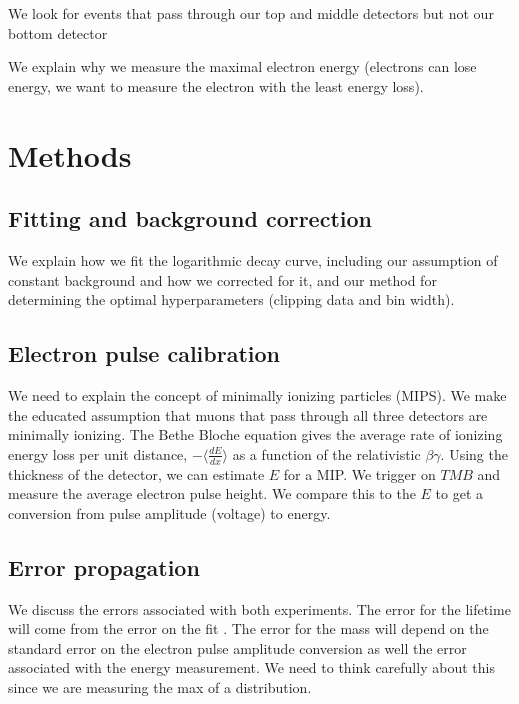 \documentclass[aps,prb,twocolumn,superscriptaddress,floatfix,longbibliography,citeautoscript]{revtex4-2}
\begin{document}
We look for events that pass through our top and middle detectors but not our bottom detector

We explain why we measure the maximal electron energy (electrons can lose energy, we want to measure the electron with the least energy loss).

\section{\label{sec:methods}Methods}
\subsection{Fitting and background correction}
We explain how we fit the logarithmic decay curve, including our assumption of constant background and how we corrected for it, and our method for determining the optimal hyperparameters (clipping data and bin width).
\subsection{Electron pulse calibration}
We need to explain the concept of minimally ionizing particles (MIPS). We make the educated assumption that muons that pass through all three detectors are minimally ionizing. The Bethe Bloche equation gives the average rate of ionizing energy loss per unit distance, $-\langle \frac{dE}{dx}\rangle$ as a function of the relativistic  $\beta\gamma$. Using the thickness of the detector, we can estimate $E$ for a MIP. We trigger on $TMB$ and measure the average electron pulse height. We compare this to the $E$ to get a conversion from pulse amplitude (voltage) to energy.
\subsection{Error propagation}
We discuss the errors associated with both experiments. The error for the lifetime will come from the error on the fit . The error for the mass will depend on the standard error on the electron pulse amplitude conversion as well the error associated with the energy measurement. We need to think carefully about this since we are measuring the max of a distribution.
\end{document}
